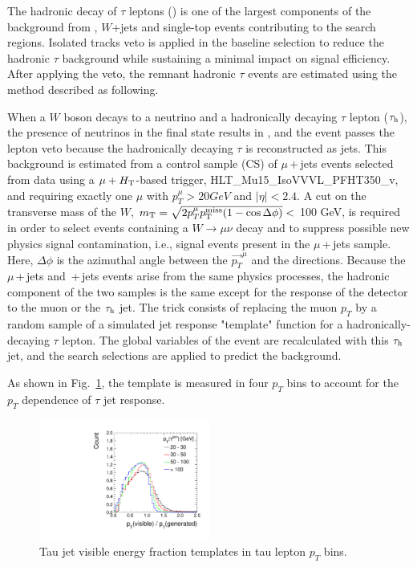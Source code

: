 The hadronic decay of $\tau$ leptons (\tauh) is one of the largest components of the background from \ttbar , $W$+jets and single-top events contributing to the search regions. Isolated tracks veto is applied in the baseline selection to reduce the hadronic $\tau$ background while sustaining a minimal impact on signal efficiency. After applying the veto, the remnant hadronic $\tau$ events are estimated using the method described as following.

When a $W$ boson decays to a neutrino and a hadronically decaying $\tau$ lepton ($\tau_\mathrm{h}$), the presence of neutrinos in the final state results in \MET, and the event passes the lepton veto because the hadronically decaying $\tau$ is reconstructed as jets. This background is estimated from a control sample (CS) of $\mu$\,+\,jets 
events selected from data using a $\mu+H_{\mathrm{T}}$-based trigger, 
HLT\_Mu15\_IsoVVVL\_PFHT350\_v, and requiring exactly one 
$\mu$ with $p_{T}^{\mu}>20 GeV$ and $|\eta|<2.4$.
A cut on the transverse mass of the $W$, 
$m_\mathrm{T}=\sqrt{2p_{T}^{\mu}p^{\rm miss}_{\rm T}(1-\cos\Delta\phi)}<$ 100 GeV, 
is required in order 
to select events containing a $W\to\mu\nu$ decay and to suppress 
possible new physics signal contamination, i.e., signal events
present in the $\mu$\,+\,jets sample. Here,
$\Delta\phi$ is the azimuthal angle between the $\vec{p_{T}}^\mu$ and the 
\MET directions.
Because the $\mu$\,+\,jets and \tauh{}\,+\,jets events arise from the same 
physics processes, the hadronic component of the two samples is the same 
except for the response of the detector to the muon or the $\tau_\mathrm{h}$ jet. 
The trick consists of replacing the muon $p_{T}$ by a random sample of a
simulated \tauh jet response "template" function for a 
hadronically-decaying $\tau$ lepton. The 
global variables of the event are recalculated with this $\tau_\mathrm{h}$ jet, and the 
search selections are applied to predict the \tauh background.

As shown in Fig.~\ref{fig:templates}, the template is measured in four $p_{T}$ bins to account for the $p_{T}$ dependence of $\tau$ jet response.

\begin{figure}[htbp]
\centering
\includegraphics[width=0.5\textwidth]{sections/mc4/Backgrounds/HadTau/figures/TauResponseTemplate.pdf}
\caption{Tau jet visible energy fraction templates in tau lepton $p_{T}$ bins.}
\label{fig:templates}
\end{figure}

